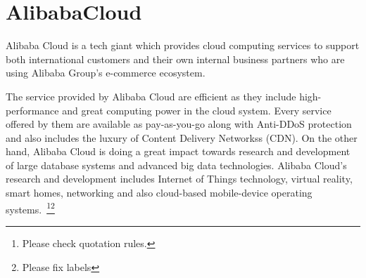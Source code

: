 \section{AlibabaCloud}

Alibaba Cloud is a tech giant which provides cloud computing services to support
both international customers and their own internal business partners who are
using Alibaba Group's e-commerce ecosystem.


The service provided by Alibaba Cloud are efficient as they include
high-performance and great computing power in the cloud system. Every service
offered by them are available as pay-as-you-go along with Anti-DDoS protection
and also includes the luxury of Content Delivery Networkss (CDN). On the other
hand, Alibaba Cloud is doing a great impact towards research and development of
large database systems and advanced big data technologies. Alibaba Cloud's
research and development includes Internet of Things technology, virtual
reality, smart homes, networking and also cloud-based mobile-device
operating systems.~\cite{AlibabaCloud}\footnote{Please check quotation
  rules.}\footnote{Please fix labels}

